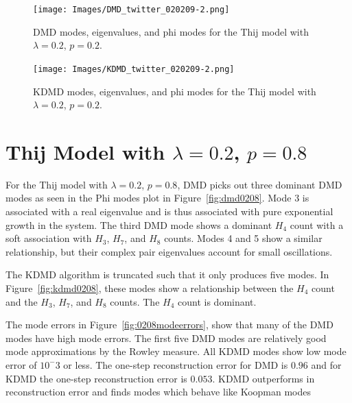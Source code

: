 
\begin{figure}
    \texttt{[image: Images/DMD\_twitter\_020209-2.png]}
    \centering
    \caption{DMD modes, eigenvalues, and phi modes for the Thij model
    with $\lambda=0.2$, $p=0.2$. \label{fig:dmd0202}}
\end{figure}


\FloatBarrier



\begin{figure}
    \texttt{[image: Images/KDMD\_twitter\_020209-2.png]}
    \centering
    \caption{KDMD modes, eigenvalues, and phi modes for the Thij model
    with $\lambda=0.2$, $p=0.2$. \label{fig:kdmd0202}}
\end{figure}

\FloatBarrier
\section{Thij Model with \texorpdfstring{$\lambda=0.2$, $p=0.8$}{l=0.2, p=0.8}}
For the Thij model with $\lambda=0.2$, $p=0.8$, DMD picks out three dominant DMD modes as 
seen in the Phi modes plot in Figure~\ref{fig:dmd0208}. Mode 3 is associated with a
real eigenvalue and is thus associated with pure exponential growth in the system. The third DMD
mode shows a dominant $H_{4}$ count with a soft association with $H_{3}$, $H_{7}$, and $H_{8}$ counts. 
Modes 4 and 5 show a similar relationship, but their complex pair eigenvalues account for small oscillations. 

The KDMD algorithm is truncated such that it only produces five modes. In Figure~\ref{fig:kdmd0208},
 these modes show a relationship 
between the $H_{4}$ count and the $H_{3}$, $H_{7}$, and $H_{8}$ counts. The $H_{4}$ count is dominant.


The mode errors in Figure~\ref{fig:0208modeerrors}, show that many of the DMD modes have high mode errors. 
The first five DMD modes are relatively good mode approximations by the Rowley measure. All KDMD modes show 
low mode error of $10^-3$ or less.
 The one-step reconstruction error for DMD is $0.96$ and for KDMD the one-step reconstruction error is $0.053$. KDMD
 outperforms in reconstruction error and finds modes which behave like Koopman modes

